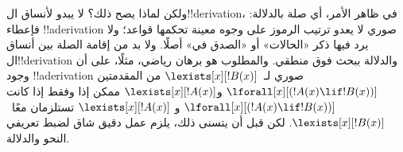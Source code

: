 \documentclass[../../../include/open-logic-section]{subfiles}
\begin{document}
ولكن لماذا يصح ذلك؟ لا يبدو لأنساق ال!!{derivation}، في ظاهر الأمر،
أي صلة بالدلالة: فإعطاء !!a{derivation} صوري لا يعدو ترتيب الرموز على
وجوه معينة تحكمها قواعد؛ ولا يرد فيها ذكر «الحالات» أو «الصدق في»
أصلًا. ولا بد من إقامة الصلة بين أنساق ال!!{derivation} والدلالة ببحث
فوق منطقي. والمطلوب هو برهان رياضي، مثلًا، على أن وجود
!!a{derivation} صوري لـ~$\lexists[x][!B(x)]$ من المقدمتين
$\lforall[x][(!A(x) \lif !B(x))]$ و$\lexists[x][!A(x)]$ ممكن إذا
وفقط إذا كانت $\lforall[x][(!A(x) \lif !B(x))]$ و
$\lexists[x][!A(x)]$ تستلزمان معًا~$\lexists[x][!B(x)]$. لكن قبل أن
يتسنى ذلك، يلزم عمل دقيق شاق لضبط تعريفي النحو والدلالة.
\end{document}
